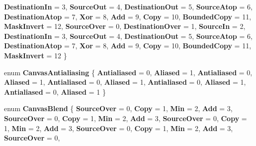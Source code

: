 \begin{DoxyCompactItemize}
{\bfseries Destination\+In} = 3, 
{\bfseries Source\+Out} = 4, 
\newline
{\bfseries Destination\+Out} = 5, 
{\bfseries Source\+Atop} = 6, 
{\bfseries Destination\+Atop} = 7, 
{\bfseries Xor} = 8, 
\newline
{\bfseries Add} = 9, 
{\bfseries Copy} = 10, 
{\bfseries Bounded\+Copy} = 11, 
{\bfseries Mask\+Invert} = 12, 
\newline
{\bfseries Source\+Over} = 0, 
{\bfseries Destination\+Over} = 1, 
{\bfseries Source\+In} = 2, 
{\bfseries Destination\+In} = 3, 
\newline
{\bfseries Source\+Out} = 4, 
{\bfseries Destination\+Out} = 5, 
{\bfseries Source\+Atop} = 6, 
{\bfseries Destination\+Atop} = 7, 
\newline
{\bfseries Xor} = 8, 
{\bfseries Add} = 9, 
{\bfseries Copy} = 10, 
{\bfseries Bounded\+Copy} = 11, 
\newline
{\bfseries Mask\+Invert} = 12
 \}
\item 
\mbox{\label{namespace_microsoft_1_1_graphics_1_1_canvas_a3ca0365f7ca6c805554d000be051da7c}} 
enum {\bfseries Canvas\+Antialiasing} \{ \newline
{\bfseries Antialiased} = 0, 
{\bfseries Aliased} = 1, 
{\bfseries Antialiased} = 0, 
{\bfseries Aliased} = 1, 
\newline
{\bfseries Antialiased} = 0, 
{\bfseries Aliased} = 1, 
{\bfseries Antialiased} = 0, 
{\bfseries Aliased} = 1, 
\newline
{\bfseries Antialiased} = 0, 
{\bfseries Aliased} = 1
 \}
\item 
\mbox{\label{namespace_microsoft_1_1_graphics_1_1_canvas_a4d6f8dfcb051c810dfc379d736e689a4}} 
enum {\bfseries Canvas\+Blend} \{ \newline
{\bfseries Source\+Over} = 0, 
{\bfseries Copy} = 1, 
{\bfseries Min} = 2, 
{\bfseries Add} = 3, 
\newline
{\bfseries Source\+Over} = 0, 
{\bfseries Copy} = 1, 
{\bfseries Min} = 2, 
{\bfseries Add} = 3, 
\newline
{\bfseries Source\+Over} = 0, 
{\bfseries Copy} = 1, 
{\bfseries Min} = 2, 
{\bfseries Add} = 3, 
\newline
{\bfseries Source\+Over} = 0, 
{\bfseries Copy} = 1, 
{\bfseries Min} = 2, 
{\bfseries Add} = 3, 
\newline
{\bfseries Source\+Over} = 0, 

\end{DoxyCompactItemize}
